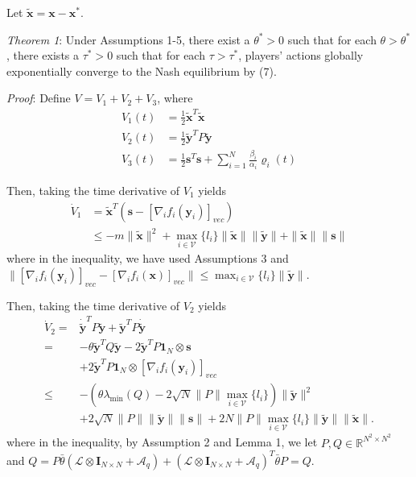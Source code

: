 \documentclass[12pt, a4paper, oneside]{ctexbook}
\begin{document}
Let $\tilde{\mathbf{x}} = \mathbf{x} - \mathbf{x}^*$.

\emph{Theorem 1}: Under Assumptions 1-5, there exist a $\theta^* > 0$ such that for each $\theta > \theta^*$, there exists a $\tau^* > 0$ such that for each $\tau > \tau^*$, players' actions globally exponentially converge to the Nash equilibrium by (7).

\emph{Proof}: Define $V = V_1 + V_2 + V_3$, where
\begin{equation}
    \begin{aligned}
    V_1(t) &= \frac{1}{2}\tilde{\mathbf{x}}^{T}\tilde{\mathbf{x}}\\
    V_2(t) &= \frac{1}{2}\tilde{\mathbf{y}}^{T}P\tilde{\mathbf{y}}\\
    V_3(t) &= \frac{1}{2}\mathbf{s}^{T}\mathbf{s} + \sum_{i = 1}^{N} \frac{\beta_i}{\alpha_i}\varrho_i(t)
    \end{aligned}
\end{equation}

Then, taking the time derivative of $V_1$ yields
\begin{equation}
    \begin{aligned}
    \dot{V}_{1}& =\tilde{\mathbf{x}}^{T}(\mathbf{s}-[\nabla_{i}f_{i}(\mathbf{y}_{i})]_{vec})  \\
    &\leq-m\|\tilde{\mathbf{x}}\|^2+\max_{i\in\mathcal{V}}\{l_i\}\|\tilde{\mathbf{x}}\|\|\tilde{\mathbf{y}}\|+\|\tilde{\mathbf{x}}\|\|\mathbf{s}\|
    \end{aligned}
\end{equation}
where in the inequality, we have used Assumptions 3 and $\|[\nabla_{i}f_{i}(\mathbf{y}_{i})]_{vec}-[\nabla_{i}f_{i}(\mathbf{x})]_{vec}\|\leq\max_{i\in\mathcal{V}}\{l_{i}\}\|\tilde{\mathbf{y}}\|$.

Then, taking the time derivative of $V_2$ yields
\begin{equation}
    \begin{aligned}
        \dot{V}_{2}=&\dot{\tilde{\mathbf{y}}}^{T}P\tilde{\mathbf{y}}+\tilde{\mathbf{y}}^{T}P\dot{\tilde{\mathbf{y}}}  \\
        =&-\theta\mathbf{\tilde{y}}^TQ\mathbf{\tilde{y}}-2\mathbf{\tilde{y}}^TP\mathbf{1}_N\otimes\mathbf{s} \\
        &+2\tilde{\mathbf{y}}^TP\mathbf{1}_N\otimes[\nabla_if_i(\mathbf{y}_i)]_{vec} \\
        \leq&-(\theta\lambda_{\min}(Q)-2\sqrt{N}\|P\|\max_{i\in\mathcal{V}}\{l_{i}\})\|\tilde{\mathbf{y}}\|^{2} \\
        &+2\sqrt{N}\|P\|\|\tilde{\mathbf{y}}\|\|\mathbf{s}\|+2N\|P\|\max_{i\in\mathcal{V}}\{l_{i}\}\|\tilde{\mathbf{y}}\|\|\tilde{\mathbf{x}}\|.
    \end{aligned}
\end{equation}
where in the inequality, by Assumption 2 and Lemma 1, we let $P,Q\in\mathbb{R}^{N^{2}\times N^{2}}$ and $Q = P\bar{\theta}(\mathcal{L}\otimes\mathbf{I}_{N\times N}+\mathcal{A}_q)+(\mathcal{L}\otimes\mathbf{I}_{N\times N}+\mathcal{A}_q)^T\bar{\theta}P=Q$.
\end{document}
